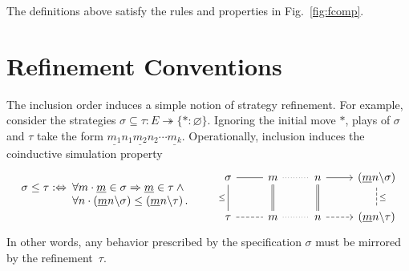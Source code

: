\documentclass[acmsmall,nonacm]{acmart}
\begin{document}
\begin{theorem} %
The definitions above satisfy the rules and properties
in Fig.~\ref{fig:fcomp}.
\end{theorem}




\section{Refinement Conventions} \label{sec:refconv} %


The inclusion order induces a simple notion of strategy refinement.
For example,
consider the strategies
$\sigma \subseteq \tau : E \twoheadrightarrow \{ {*} : \varnothing \}$.
Ignoring the initial move $*$,
plays of $\sigma$ and $\tau$ take the form
$
  \underline{m_1} n_1 \underline{m_2} n_2 \cdots \underline{m_k}
$.
Operationally,
inclusion induces the coinductive simulation property
\begin{equation} \label{eqn:sim}
  \begin{array}{r@{\:}l}
  \sigma \le \tau :\Leftrightarrow {} &
  \forall m \cdot
    \underline{m} \in \sigma \Rightarrow
    \underline{m} \in \tau \wedge {} \\ &
  \forall n \cdot
    (\underline{m} n \backslash \sigma) \le
    (\underline{m} n \backslash \tau)
  \,.
  \end{array}
  \qquad
  \begin{tikzcd}
    \sigma \ar[r,dash] \ar[d, dash, "\le"'] &
    m \ar[r,dotted,dash] \ar[d,equal] &
    n \ar[r] \ar[d,equal] &
    (\underline{m} n \backslash \sigma) \ar[d, dash, dashed, "\le"]
    \\
    \tau \ar[r,dash, dashed] &
    m \ar[r,dotted,dash] &
    n \ar[r,dashed] &
    (\underline{m} n \backslash \tau)
  \end{tikzcd}
\end{equation}
In other words,
any behavior prescribed by the specification $\sigma$
must be mirrored by the refinement~$\tau$.
\end{document}
